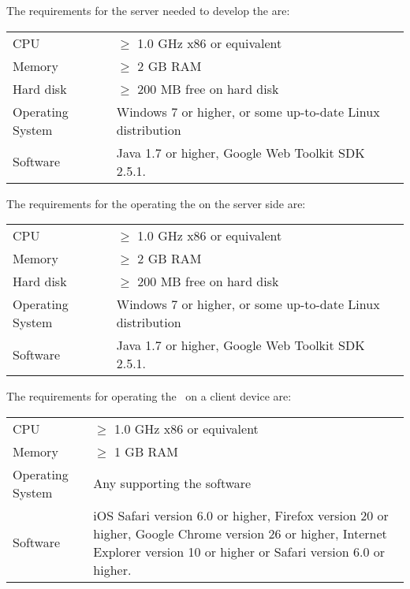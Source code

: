 \fpstartparagraph{} The requirements for the server needed to develop the \applicationname{} are:

\begin{center}
\begin{tabular}{p{} p{}}
CPU & $\geq$ 1.0 GHz x86 or equivalent \\
Memory & $\geq$ 2 GB RAM \\
Hard disk & $\geq$ 200 MB free on hard disk \\
Operating System & Windows 7 or higher, or some up-to-date Linux distribution\\
Software & Java 1.7 or higher, Google Web Toolkit SDK 2.5.1.\\
\end{tabular}
\end{center}

\fpstartparagraph{} The requirements for the operating the \applicationname{} on the server side are:

\begin{center}
\begin{tabular}{p{} p{}}
CPU & $\geq$ 1.0 GHz x86 or equivalent \\
Memory & $\geq$ 2 GB RAM \\
Hard disk & $\geq$ 200 MB free on hard disk \\
Operating System & Windows 7 or higher, or some up-to-date Linux distribution\\
Software & Java 1.7 or higher, Google Web Toolkit SDK 2.5.1.\\
\end{tabular}
\end{center}

\begin{samepage}
\fpstartparagraph{} The requirements for operating the \applicationname\ on a client device are:

\begin{center}
\begin{tabular}{p{} p{}}
CPU & $\geq$ 1.0 GHz x86 or equivalent \\
Memory & $\geq$ 1 GB RAM \\
Operating System & Any supporting the software\\
Software & iOS Safari version 6.0 or higher, Firefox version 20 or higher, Google Chrome version 26 or higher, Internet Explorer version 10 or higher or Safari version 6.0 or higher.\\
\end{tabular}
\end{center}
\end{samepage}